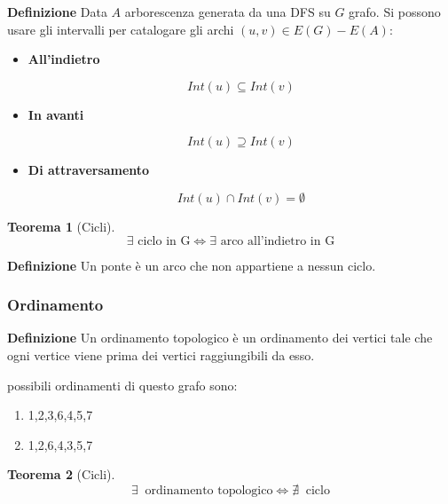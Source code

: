 \documentclass{article}
\newtheorem{theorem}{Teorema}
\begin{document}
\noindent\textbf{Definizione} Data $A$ arborescenza generata da una DFS su $G$ grafo. Si possono usare gli intervalli per catalogare gli archi $(u,v)\in E(G)-E(A)$:
\begin{itemize}
    \item \textbf{All'indietro}

        $$Int(u)\subseteq Int(v)$$
    
    \item \textbf{In avanti}

        $$Int(u)\supseteq Int(v)$$
    
    \item \textbf{Di attraversamento}

        $$Int(u)\cap Int(v)=\emptyset$$\newline
    
\end{itemize}

\begin{theorem}[Cicli]
    $$\exists\text{ ciclo in G}\iff\exists\text{ arco all'indietro in G}$$\newline
\end{theorem}

\noindent\textbf{Definizione} Un ponte è un arco che non appartiene a nessun ciclo.\newline

\subsubsection{Ordinamento}

\textbf{Definizione} Un ordinamento topologico è un ordinamento dei vertici tale che ogni vertice viene prima dei vertici raggiungibili da esso.

\begin{figure}[H]
    \centering
    
    \label{fig:ord}
\end{figure}

 possibili ordinamenti di questo grafo sono:
\begin{enumerate}
    \item 1,2,3,6,4,5,7
    \item 1,2,6,4,3,5,7\newline
\end{enumerate}

\begin{theorem}[Cicli]
    $$\exists\ \text{ ordinamento topologico}\iff \nexists \ \text{ ciclo}$$\newline
\end{theorem}
\end{document}
